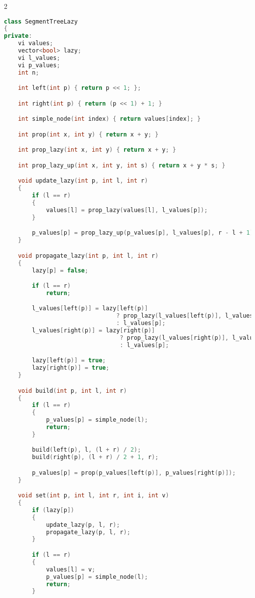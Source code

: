 \documentclass[leter]{amsart}
\begin{document}
\begin{multicols}{2}
\begin{lstlisting}[language=C++]
class SegmentTreeLazy
{
private:
    vi values;
    vector<bool> lazy;
    vi l_values;
    vi p_values;
    int n;

    int left(int p) { return p << 1; };

    int right(int p) { return (p << 1) + 1; }

    int simple_node(int index) { return values[index]; }

    int prop(int x, int y) { return x + y; }

    int prop_lazy(int x, int y) { return x + y; }

    int prop_lazy_up(int x, int y, int s) { return x + y * s; }

    void update_lazy(int p, int l, int r)
    {
        if (l == r)
        {
            values[l] = prop_lazy(values[l], l_values[p]);
        }

        p_values[p] = prop_lazy_up(p_values[p], l_values[p], r - l + 1);
    }

    void propagate_lazy(int p, int l, int r)
    {
        lazy[p] = false;

        if (l == r)
            return;

        l_values[left(p)] = lazy[left(p)]
                                ? prop_lazy(l_values[left(p)], l_values[p])
                                : l_values[p];
        l_values[right(p)] = lazy[right(p)]
                                 ? prop_lazy(l_values[right(p)], l_values[p])
                                 : l_values[p];

        lazy[left(p)] = true;
        lazy[right(p)] = true;
    }

    void build(int p, int l, int r)
    {
        if (l == r)
        {
            p_values[p] = simple_node(l);
            return;
        }

        build(left(p), l, (l + r) / 2);
        build(right(p), (l + r) / 2 + 1, r);

        p_values[p] = prop(p_values[left(p)], p_values[right(p)]);
    }

    void set(int p, int l, int r, int i, int v)
    {
        if (lazy[p])
        {
            update_lazy(p, l, r);
            propagate_lazy(p, l, r);
        }

        if (l == r)
        {
            values[l] = v;
            p_values[p] = simple_node(l);
            return;
        }


\end{lstlisting}
\end{multicols}
\end{document}
